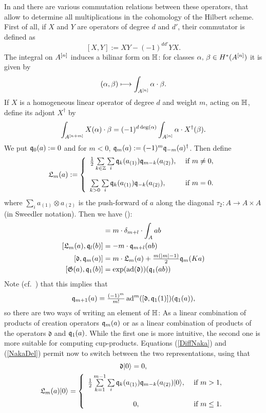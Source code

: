 In \cite{LehnSorger} and \cite{LiQinWang} there are various commutation relations between these operators, that allow to determine all multiplications in the cohomology of the Hilbert scheme. First of all, if $X$ and $Y$ are operators of degree $d$ and $d'$, their commutator is defined as 
$$
[X,Y] := XY - (-1)^{dd'}YX.
$$
The integral on $A^{[n]}$ induces a bilinar form on $\mathbb{H}$: for classes $\alpha,\,\beta\in H^*(A^{[n]})$ it is given by
$$
(\alpha,\beta) \longmapsto \int_{A^{[n]}}\alpha\cdot\beta.
$$
If $X$ is a homogeneous linear operator of degree $d$ and weight $m$, acting on $\mathbb{H}$, define its adjont $X^\dagger$ by
$$
\int_{A^{[n+m]}}X(\alpha)\cdot\beta = (-1)^{d\deg(\alpha)}\int_{A^{[n]}} \alpha \cdot X^\dagger (\beta).
$$
We put $\mathfrak{q}_0(a) :=0$ and for $m<0$, $\mathfrak{q}_m(a) := (-1)^m \mathfrak{q}_{-m}(a)^\dagger$. Then define
$$
\mathfrak{L}_m(a) := \left\{ 
\begin{array}{ll}
 \tfrac{1}{2}\sum\limits_{k\in\Z}\sum\limits_{i}\q_k( a_{(1)})\q_{m-k}( a_{(2)}), & \text{ if } m\neq 0, \vspace{4mm}\\
 \sum\limits_{k>0}\sum\limits_{i}\q_k( a_{(1)})\q_{-k}( a_{(2)}), & \text{ if } m= 0. \\
\end{array}
\right.
$$
where $\sum_i a_{(1)}\otimes  a_{(2)}$ is the push-forward of $a$ along the diagonal $\tau_2 :A \rightarrow A\times A$ (in Sweedler notation).
Then we have (\cite[Thm.~2.16]{LiQinWang}):
\begin{align}
[\q_m(a), \q_l(b)] &= m\cdot \delta_{m+l} \cdot \int_A ab \\
[\mathfrak{L}_m(a),\q_l(b)] &= -m\cdot \q_{m+l}(ab) \\
\label{DiffNaka}
[\mathfrak{d},\q_m(a)] &= m \cdot \mathfrak{L}_m(a) + \tfrac{m(|m|-1)}{2} \q_m(K a) \\
[\G(a),\q_1(b)] &= \exp(\ad(\mathfrak{d}))(\q_1(a b) )
\end{align}
Note (cf.~\cite[Thm.~3.8]{LehnSorger}) that this implies that 
\begin{equation}\label{NakaDel}
\mathfrak{q}_{m+1}(a) = \tfrac{(-1)^m}{m!}\operatorname{ad}^m([\mathfrak{d},\mathfrak{q}_1(1)])(\mathfrak{q}_1(a)),
\end{equation}
so there are two ways of writing an element of $\mathbb{H}$: As a linear combination of products of creation operators $\mathfrak{q}_m(a)$ or as a linear combination of products of the operators $\mathfrak{d}$ and $\mathfrak{q}_1(a)$. While the first one is more intuitive, the second one is more suitable for computing cup-products. 
Equations (\ref{DiffNaka}) and (\ref{NakaDel}) permit now to switch between the two representations, using that
\begin{gather}
\mathfrak{d} \vac = 0 ,  \\
\mathfrak{L}_m(a) \vac = \left\{ 
\begin{array}{cl}
 \tfrac{1}{2}\sum\limits_{k=1}^{m-1}\sum\limits_{i}\q_k(a_{(1)})\q_{m-k}(a_{(2)})\vac, & \text{ if } m>1, \vspace{4mm}\\
 0, & \text{ if } m\leq 1. \\
\end{array}
\right.\\
\end{gather}


